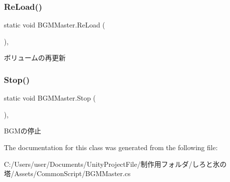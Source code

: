 \subsubsection{\texorpdfstring{Re\+Load()}{ReLoad()}}
{\footnotesize\ttfamily static void B\+G\+M\+Master.\+Re\+Load (\begin{DoxyParamCaption}{ }\end{DoxyParamCaption})\hspace{0.3cm}{\ttfamily [inline]}, {\ttfamily [static]}}



ボリュームの再更新 

\mbox{\label{class_b_g_m_master_a5e92f2d9dd69d2fb621101f56ec7a3c7}} 
\subsubsection{\texorpdfstring{Stop()}{Stop()}}
{\footnotesize\ttfamily static void B\+G\+M\+Master.\+Stop (\begin{DoxyParamCaption}{ }\end{DoxyParamCaption})\hspace{0.3cm}{\ttfamily [inline]}, {\ttfamily [static]}}



B\+G\+Mの停止 



The documentation for this class was generated from the following file\+:\begin{DoxyCompactItemize}
\item 
C\+:/\+Users/user/\+Documents/\+Unity\+Project\+File/制作用フォルダ/しろと氷の塔/\+Assets/\+Common\+Script/B\+G\+M\+Master.\+cs\end{DoxyCompactItemize}
